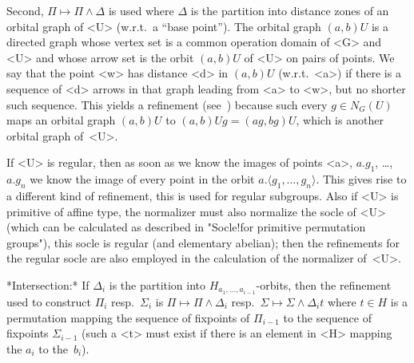 Second, $\Pi \mapsto \Pi  \wedge \Delta$  is  used where $\Delta$  is the
partition into distance zones of an orbital graph of <U> (w.r.t.~a ``base
point''). The orbital graph $(a,b)U$ is a directed graph whose vertex set
is a common  operation domain of <G> and  <U> and whose  arrow set is the
orbit $(a,b)U$ of <U> on pairs  of points. We say  that the point <w> has
distance  <d> in $(a,b)U$ (w.r.t.~<a>)  if   there is  a sequence of  <d>
arrows in  that  graph  leading from <a>  to  <w>,  but no   shorter such
sequence.  This yields a  refinement (see~\cite{Theissen97}) because such
every $g\in   N_G(U)$  maps an  orbital  graph  $(a,b)U$  to  $(a,b)Ug  =
(ag,bg)U$, which is another orbital graph of~<U>.

If <U> is regular,  then as soon  as we  know  the images of points  <a>,
$a.g_1$, \dots,  $a.g_n$ we know  the image of  every  point in the orbit
$a.\langle  g_1,\ldots,g_n \rangle$. This  gives rise to a different kind
of   refinement, this is    used for regular   subgroups. Also  if <U> is
primitive of affine type, the normalizer must also normalize the socle of
<U>  (which can be     calculated as described  in   "Socle!for primitive
permutation  groups"),  this socle is   regular (and elementary abelian);
then the refinements   for the regular   socle are also  employed in  the
calculation of the normalizer of~<U>.


\medskip
*Intersection:*      If     $\Delta_i$   is  the       partition     into
$H_{a_1,\ldots,a_{i-1}}$-orbits, then the  refinement  used to  construct
$\Pi_i$    resp.~$\Sigma_i$    is   $\Pi\mapsto      \Pi\wedge  \Delta_i$
resp.~$\Sigma\mapsto \Sigma\wedge   \Delta_i  t$  where  $t\in  H$  is  a
permutation  mapping  the sequence  of  fixpoints of  $\Pi_{i-1}$ to  the
sequence of  fixpoints $\Sigma_{i-1}$ (such a <t>  must exist if there is
an element in <H> mapping the $a_i$ to the~$b_i$).

